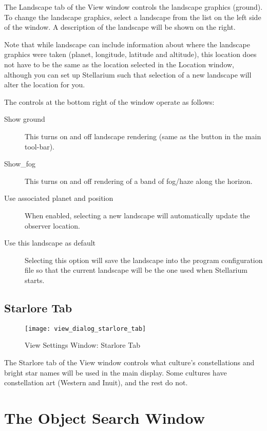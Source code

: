 The Landscape tab of the View window controls the landscape graphics
(ground). To change the landscape graphics, select a landscape from the
list on the left side of the window. A description of the landscape will
be shown on the right.

Note that while landscape can include information about where the
landscape graphics were taken (planet, longitude, latitude and
altitude), this location does not have to be the same as the location
selected in the Location window, although you can set up Stellarium such
that selection of a new landscape will alter the location for you.

The controls at the bottom right of the window operate as follows:

\begin{description}
\item[Show ground] This turns on and off landscape rendering (same
  as the button in the main tool-bar).
\item[Show\_fog] This turns on and off rendering of a band of
  fog/haze along the horizon.
\item[Use associated planet and position] When enabled, selecting a
  new landscape will automatically update the observer location.
\item[Use this landscape as default] Selecting this option will save
  the landscape into the program configuration file so that the current
  landscape will be the one used when Stellarium starts.
\end{description}

\subsection{Starlore Tab}
\label{sec:gui:view:starlore}

\begin{figure}[t]
\centering\texttt{[image: view\_dialog\_starlore\_tab]}
\caption{View Settings Window: Starlore Tab}
\label{fig:gui:view:starlore}
\end{figure}

The Starlore tab of the View window controls what culture's
constellations and bright star names will be used in the main display.
Some cultures have constellation art (Western and Inuit), and the rest
do not.


\section{The Object Search Window}
\label{sec:gui:search}

